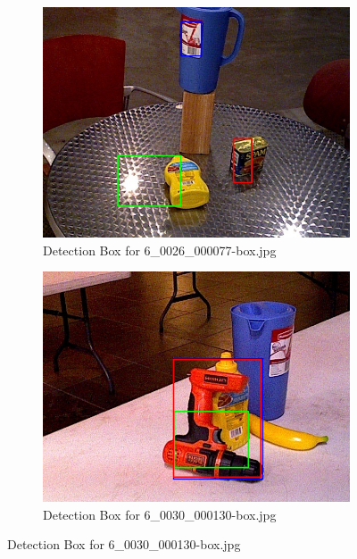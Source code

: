 \documentclass[10.5pt,a4paper]{article}
\begin{document}
\begin{figure}
    \vspace{2em}

    \begin{subfigure}{0.45\textwidth}
        \centering
        \includegraphics[width=\textwidth]{img/6_0026_000077-box.jpg}
        \caption{Detection Box for 6\_0026\_000077-box.jpg}
        \label{fig:img15}
    \end{subfigure}
    \hfill
    \begin{subfigure}{0.45\textwidth}
        \centering
        \includegraphics[width=\textwidth]{img/6_0030_000130-box.jpg}
        \caption{Detection Box for 6\_0030\_000130-box.jpg}
        \label{fig:img16}
    \end{subfigure}


\end{figure}
\end{document}
